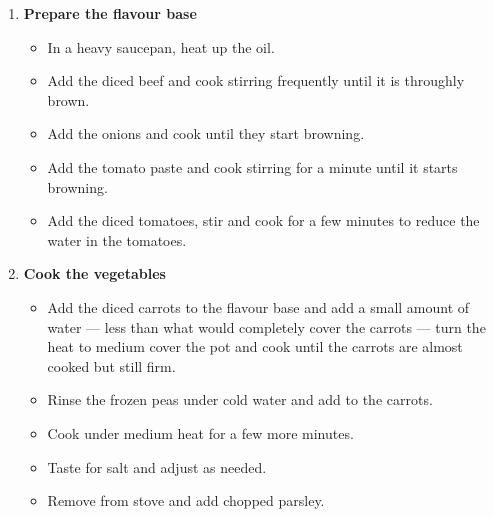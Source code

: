 \documentclass [11pt, letterpaper] {article}
\begin{document}
\begin{description}
\begin{enumerate}
	\item {\bf Prepare the flavour base}
	\begin{itemize}
	\item In a heavy saucepan, heat up the oil.
	\item Add the diced beef and cook stirring frequently until it is throughly brown.
	\item Add the onions and cook until they start browning.
	\item Add the tomato paste and cook stirring for a minute until it starts browning.
	\item Add the diced tomatoes, stir and cook for a few minutes to reduce the water in the tomatoes.
	\end{itemize}
	
	\item {\bf Cook the vegetables}
	\begin{itemize}
	\item Add the diced carrots to the flavour base and add a small amount of water --- less than what would completely cover the carrots --- turn the heat to medium cover the pot and cook until the carrots are almost cooked but still firm.
	\item Rinse the frozen peas under cold water and add to the carrots.
	\item Cook under medium heat for a few more minutes.
	\item Taste for salt and adjust as needed.
	\item Remove from stove and add chopped parsley.
	\end{itemize}
	\end{enumerate}
\end{description}
\end{document}
